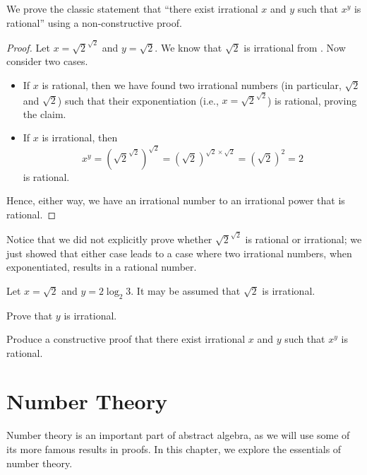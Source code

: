 \begin{example}
    We prove the classic statement that ``there exist irrational $x$ and $y$ such that $x^y$ is rational'' using a non-constructive proof.
    \begin{proof}
        Let $x = \sqrt2^{\sqrt2}$ and $y = \sqrt2$. We know that $\sqrt2$ is irrational from . Now consider two cases.
        \begin{itemize}
            \item If $x$ is rational, then we have found two irrational numbers (in particular, $\sqrt 2$ and $\sqrt 2$) such that their exponentiation (i.e.,  $x = \sqrt2^{\sqrt2}$) is rational, proving the claim.
            \item If $x$ is irrational, then \[x^y = \left(\sqrt2^{\sqrt2}\right)^{\sqrt2} = (\sqrt2)^{\sqrt2 \times \sqrt2} = (\sqrt2)^2 = 2\]
            is rational.
        \end{itemize}
        Hence, either way, we have an irrational number to an irrational power that is rational.
    \end{proof}
    
    \newpage

    Notice that we did not explicitly prove whether $\sqrt2^{\sqrt2}$ is rational or irrational; we just showed that either case leads to a case where two irrational numbers, when exponentiated, results in a rational number.
\end{example}

\begin{exercise}
    Let $x = \sqrt2$ and $y = 2\log_2{3}$. It may be assumed that $\sqrt2$ is irrational.
    \begin{partquestions}{\roman*}
        \item Prove that $y$ is irrational.
        \item Produce a constructive proof that there exist irrational $x$ and $y$ such that $x^y$ is rational.
    \end{partquestions}
\end{exercise}

\chapter{Number Theory}
Number theory is an important part of abstract algebra, as we will use some of its more famous results in proofs. In this chapter, we explore the essentials of number theory.

